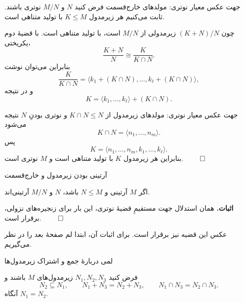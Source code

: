 \begin{frame}[t]{جهت عکس معیار نوتری: مولدهای خارج‌قسمت}
    \label{lec11:noetherian-extension-quotient}
    فرض کنید $N$ و $M/N$ نوتری باشند. ثابت می‌کنیم هر زیرمدول
    $K\leqslant M$ با تولید متناهی است.

    چون $(K+N)/N$ زیرمدولی از $M/N$ است، با تولید متناهی است.
    با قضیهٔ دوم یکریختی،
    \[
        \frac{K+N}{N}\cong\frac{K}{K\cap N}.
    \]
    بنابراین می‌توان نوشت
    \[
        \frac{K}{K\cap N}
        =\bigl\langle k_1+(K\cap N),\ldots,k_\ell+(K\cap N)\bigr\rangle,
    \]
    و در نتیجه
    \[
        K=\langle k_1,\ldots,k_\ell\rangle+(K\cap N).
    \]
\end{frame}

\begin{frame}[t]{جهت عکس معیار نوتری: مولدهای زیرمدول}
    \label{lec11:noetherian-extension-generators}
    از $K\cap N\leqslant N$ و نوتری بودنِ $N$ نتیجه می‌شود
    \[
        K\cap N=\langle n_1,\ldots,n_m\rangle.
    \]
    پس
    \[
        K=\langle n_1,\ldots,n_m,k_1,\ldots,k_\ell\rangle.
    \]
    بنابراین هر زیرمدول $K$ با تولید متناهی است و $M$ نوتری است.
    \hfill\(\qed\)
\end{frame}

\begin{frame}[t]{آرتینی بودن زیرمدول و خارج‌قسمت}
    \label{lec11:artinian-inheritance}
    \begin{theorem}
        اگر $M$ آرتینی و $N\leqslant M$ باشد، $N$ و $M/N$ آرتینی‌اند.
    \end{theorem}
    \textbf{اثبات.} همان استدلال جهت مستقیمِ قضیهٔ نوتری،
    این بار برای زنجیره‌های نزولی، برقرار است.
    \hfill\(\qed\)

    \medskip
    عکس این قضیه نیز برقرار است. برای اثبات آن، ابتدا لم صفحهٔ بعد را در نظر می‌گیریم.
\end{frame}

\begin{frame}[t]{لمی دربارهٔ جمع و اشتراک زیرمدول‌ها}
    \label{lec11:modular-lemma}
    \begin{lemma}
        فرض کنید $N_1,N_2,N_3$ زیرمدول‌های $M$ باشند و
        \[
            N_2\subseteq N_1,\qquad
            N_1+N_3=N_2+N_3,\qquad
            N_1\cap N_3=N_2\cap N_3.
        \]
        آنگاه $N_1=N_2$.
    \end{lemma}
\end{frame}

